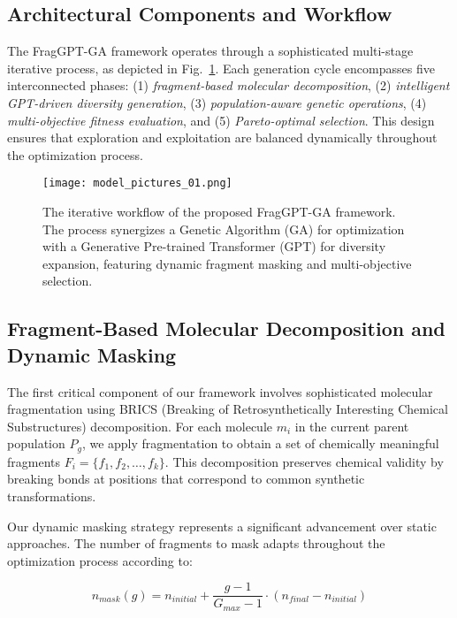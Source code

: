 \documentclass[lettersize,journal]{IEEEtran}
\begin{document}
\subsection{Architectural Components and Workflow}

The FragGPT-GA framework operates through a sophisticated multi-stage iterative process, as depicted in Fig.~\ref{fig:flowchart}. Each generation cycle encompasses five interconnected phases: (1) \textit{fragment-based molecular decomposition}, (2) \textit{intelligent GPT-driven diversity generation}, (3) \textit{population-aware genetic operations}, (4) \textit{multi-objective fitness evaluation}, and (5) \textit{Pareto-optimal selection}. This design ensures that exploration and exploitation are balanced dynamically throughout the optimization process.

\begin{figure}[!t]
\centering
\texttt{[image: model\_pictures\_01.png]}
\caption{The iterative workflow of the proposed FragGPT-GA framework. The process synergizes a Genetic Algorithm (GA) for optimization with a Generative Pre-trained Transformer (GPT) for diversity expansion, featuring dynamic fragment masking and multi-objective selection.}
\label{fig:flowchart}
\end{figure}

\subsection{Fragment-Based Molecular Decomposition and Dynamic Masking}

The first critical component of our framework involves sophisticated molecular fragmentation using BRICS (Breaking of Retrosynthetically Interesting Chemical Substructures) decomposition. For each molecule $m_i$ in the current parent population $P_g$, we apply fragmentation to obtain a set of chemically meaningful fragments $F_i = \{f_1, f_2, \ldots, f_k\}$. This decomposition preserves chemical validity by breaking bonds at positions that correspond to common synthetic transformations.

Our dynamic masking strategy represents a significant advancement over static approaches. The number of fragments to mask adapts throughout the optimization process according to:

\begin{equation}
n_{mask}(g) = n_{initial} + \frac{g-1}{G_{max}-1} \cdot (n_{final} - n_{initial})
\end{equation}
\end{document}
